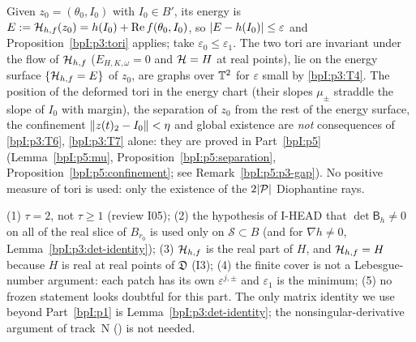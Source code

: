 \begin{remark}\label{bpI:p3:consumption}
Given $z_0=(\theta_0,I_0)$ with $I_0\in B'$, its energy is $E:=\mathcal H_{h,f}(z_0)=h(I_0)+\operatorname{Re}f(\theta_0,I_0)$, so $\lvert E-h(I_0)\rvert\le\varepsilon$ and Proposition~\ref{bpI:p3:tori} applies; take $\varepsilon_0\le\varepsilon_1$.
The two tori are invariant under the flow of $\mathcal H_{h,f}$ ($E_{H,K,\omega}=0$ and $\mathcal H=H$ at real points), lie on the energy surface $\{\mathcal H_{h,f}=E\}$ of $z_0$, are graphs over $\mathbb{T}^2$ for $\varepsilon$ small by \ref{bpI:p3:T4}. The position of the deformed tori in the energy chart (their slopes $\mu_\pm$ straddle the slope of $I_0$ with margin), the separation of $z_0$ from the rest of the energy surface, the confinement $\lVert z(t)_2-I_0\rVert<\eta$ and global existence are \emph{not} consequences of \ref{bpI:p3:T6}, \ref{bpI:p3:T7} alone: they are proved in Part~\ref{bpI:p5} (Lemma~\ref{bpI:p5:mu}, Proposition~\ref{bpI:p5:separation}, Proposition~\ref{bpI:p5:confinement}; see Remark~\ref{bpI:p5:p3-gap}). No positive measure of tori is used: only the existence of the $2\lvert \mathcal P\rvert$ Diophantine rays.
\end{remark}

\begin{remark}\label{bpI:p3:doubts}
(1) $\tau=2$, not $\tau\ge1$ (review I05); (2) the hypothesis of I-HEAD that $\det\mathsf B_h\ne0$ on all of the real slice of $B_{r_0}$ is used only on $\mathcal S\subset B$ (and for $\nabla h\ne0$, Lemma~\ref{bpI:p3:det-identity}); (3) $\mathcal H_{h,f}$ is the real part of $H$, and
$\mathcal H_{h,f}=H$ because $H$ is real at real points of $\mathfrak D$ (I3); (4) the finite cover is not a Lebesgue-number argument: each patch has its own $\varepsilon^{j,\pm}$ and $\varepsilon_1$ is the minimum; (5) no frozen statement looks doubtful for this part.
The only matrix identity we use beyond Part~\ref{bpI:p1} is Lemma~\ref{bpI:p3:det-identity}; the nonsingular-derivative argument of track~N () is not needed.
\end{remark}
